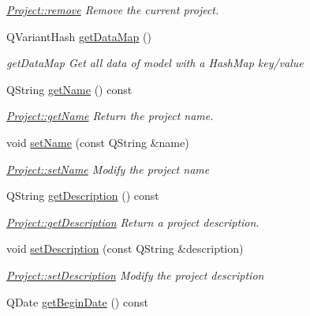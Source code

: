 \begin{DoxyCompactItemize}
\begin{DoxyCompactList}\small\item\em \hyperlink{classModels_1_1Project_ab55c71c009ae796e7dbe03017fed67ee}{Project\+::remove} Remove the current project. \end{DoxyCompactList}\item 
Q\+Variant\+Hash \hyperlink{classModels_1_1Project_a7db5156657a7dbadd024aead14a40182}{get\+Data\+Map} ()
\begin{DoxyCompactList}\small\item\em get\+Data\+Map Get all data of model with a Hash\+Map key/value \end{DoxyCompactList}\item 
Q\+String \hyperlink{classModels_1_1Project_a11d3b85bdc38daba928bfbfd962a0e32}{get\+Name} () const 
\begin{DoxyCompactList}\small\item\em \hyperlink{classModels_1_1Project_a11d3b85bdc38daba928bfbfd962a0e32}{Project\+::get\+Name} Return the project name. \end{DoxyCompactList}\item 
void \hyperlink{classModels_1_1Project_ac5ffa6ff6d31647fd880881257f47889}{set\+Name} (const Q\+String \&name)
\begin{DoxyCompactList}\small\item\em \hyperlink{classModels_1_1Project_ac5ffa6ff6d31647fd880881257f47889}{Project\+::set\+Name} Modify the project {\itshape name} \end{DoxyCompactList}\item 
Q\+String \hyperlink{classModels_1_1Project_a065b9cd68962c78302a84c686e10ae13}{get\+Description} () const 
\begin{DoxyCompactList}\small\item\em \hyperlink{classModels_1_1Project_a065b9cd68962c78302a84c686e10ae13}{Project\+::get\+Description} Return a project description. \end{DoxyCompactList}\item 
void \hyperlink{classModels_1_1Project_a2cccaca77bff95f13b3320f3f03dc9e7}{set\+Description} (const Q\+String \&description)
\begin{DoxyCompactList}\small\item\em \hyperlink{classModels_1_1Project_a2cccaca77bff95f13b3320f3f03dc9e7}{Project\+::set\+Description} Modify the project {\itshape description} \end{DoxyCompactList}\item 
Q\+Date \hyperlink{classModels_1_1Project_a31b8e46aabb1327499f7e36f170900e3}{get\+Begin\+Date} () const 

\end{DoxyCompactItemize}

